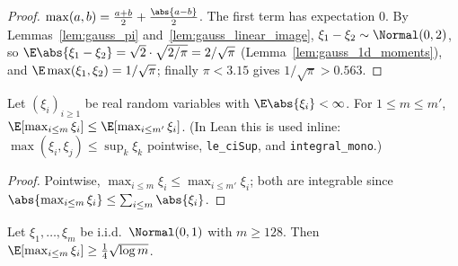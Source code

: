 \begin{proof}
\leanok
{}
$\max(a,b) = \frac{a+b}{2} + \frac{\abs{a-b}}{2}$. The first term has expectation $0$. By
Lemmas~\ref{lem:gauss_pi} and~\ref{lem:gauss_linear_image}, $\xi_1-\xi_2\sim\Normal(0,2)$, so
$\E\abs{\xi_1-\xi_2} = \sqrt2\cdot\sqrt{2/\pi} = 2/\sqrt\pi$ (Lemma~\ref{lem:gauss_1d_moments}),
and $\E\max(\xi_1,\xi_2) = 1/\sqrt\pi$; finally $\pi < 3.15$ gives $1/\sqrt\pi > 0.563$.
\end{proof}

\begin{lemma}\label{lem:psf_max_mono}
\leanok
Let $(\xi_i)_{i\ge1}$ be real random variables with $\E\abs{\xi_i}<\infty$. For $1\le m\le m'$,
$\E[\max_{i\le m}\xi_i] \le \E[\max_{i\le m'}\xi_i]$.
(In Lean this is used inline: $\max(\xi_i,\xi_j) \le \sup_k\xi_k$ pointwise, \texttt{le\_ciSup},
and \texttt{integral\_mono}.)
\end{lemma}

\begin{proof}
\leanok
Pointwise, $\max_{i\le m}\xi_i\le\max_{i\le m'}\xi_i$; both are integrable since
$\abs{\max_{i\le m}\xi_i}\le\sum_{i\le m}\abs{\xi_i}$.
\end{proof}

\begin{lemma}\label{lem:psf_max_lower_large}
\leanok
{}
Let $\xi_1,\dots,\xi_m$ be i.i.d.\ $\Normal(0,1)$ with $m \ge 128$. Then
$\E[\max_{i\le m}\xi_i] \ge \frac14\sqrt{\log m}$.
\end{lemma}

